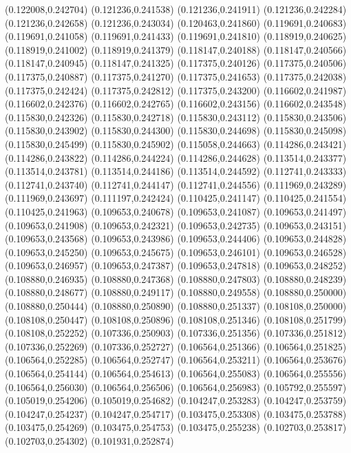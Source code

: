 (0.122008,0.242704)
(0.121236,0.241538)
(0.121236,0.241911)
(0.121236,0.242284)
(0.121236,0.242658)
(0.121236,0.243034)
(0.120463,0.241860)
(0.119691,0.240683)
(0.119691,0.241058)
(0.119691,0.241433)
(0.119691,0.241810)
(0.118919,0.240625)
(0.118919,0.241002)
(0.118919,0.241379)
(0.118147,0.240188)
(0.118147,0.240566)
(0.118147,0.240945)
(0.118147,0.241325)
(0.117375,0.240126)
(0.117375,0.240506)
(0.117375,0.240887)
(0.117375,0.241270)
(0.117375,0.241653)
(0.117375,0.242038)
(0.117375,0.242424)
(0.117375,0.242812)
(0.117375,0.243200)
(0.116602,0.241987)
(0.116602,0.242376)
(0.116602,0.242765)
(0.116602,0.243156)
(0.116602,0.243548)
(0.115830,0.242326)
(0.115830,0.242718)
(0.115830,0.243112)
(0.115830,0.243506)
(0.115830,0.243902)
(0.115830,0.244300)
(0.115830,0.244698)
(0.115830,0.245098)
(0.115830,0.245499)
(0.115830,0.245902)
(0.115058,0.244663)
(0.114286,0.243421)
(0.114286,0.243822)
(0.114286,0.244224)
(0.114286,0.244628)
(0.113514,0.243377)
(0.113514,0.243781)
(0.113514,0.244186)
(0.113514,0.244592)
(0.112741,0.243333)
(0.112741,0.243740)
(0.112741,0.244147)
(0.112741,0.244556)
(0.111969,0.243289)
(0.111969,0.243697)
(0.111197,0.242424)
(0.110425,0.241147)
(0.110425,0.241554)
(0.110425,0.241963)
(0.109653,0.240678)
(0.109653,0.241087)
(0.109653,0.241497)
(0.109653,0.241908)
(0.109653,0.242321)
(0.109653,0.242735)
(0.109653,0.243151)
(0.109653,0.243568)
(0.109653,0.243986)
(0.109653,0.244406)
(0.109653,0.244828)
(0.109653,0.245250)
(0.109653,0.245675)
(0.109653,0.246101)
(0.109653,0.246528)
(0.109653,0.246957)
(0.109653,0.247387)
(0.109653,0.247818)
(0.109653,0.248252)
(0.108880,0.246935)
(0.108880,0.247368)
(0.108880,0.247803)
(0.108880,0.248239)
(0.108880,0.248677)
(0.108880,0.249117)
(0.108880,0.249558)
(0.108880,0.250000)
(0.108880,0.250444)
(0.108880,0.250890)
(0.108880,0.251337)
(0.108108,0.250000)
(0.108108,0.250447)
(0.108108,0.250896)
(0.108108,0.251346)
(0.108108,0.251799)
(0.108108,0.252252)
(0.107336,0.250903)
(0.107336,0.251356)
(0.107336,0.251812)
(0.107336,0.252269)
(0.107336,0.252727)
(0.106564,0.251366)
(0.106564,0.251825)
(0.106564,0.252285)
(0.106564,0.252747)
(0.106564,0.253211)
(0.106564,0.253676)
(0.106564,0.254144)
(0.106564,0.254613)
(0.106564,0.255083)
(0.106564,0.255556)
(0.106564,0.256030)
(0.106564,0.256506)
(0.106564,0.256983)
(0.105792,0.255597)
(0.105019,0.254206)
(0.105019,0.254682)
(0.104247,0.253283)
(0.104247,0.253759)
(0.104247,0.254237)
(0.104247,0.254717)
(0.103475,0.253308)
(0.103475,0.253788)
(0.103475,0.254269)
(0.103475,0.254753)
(0.103475,0.255238)
(0.102703,0.253817)
(0.102703,0.254302)
(0.101931,0.252874)
